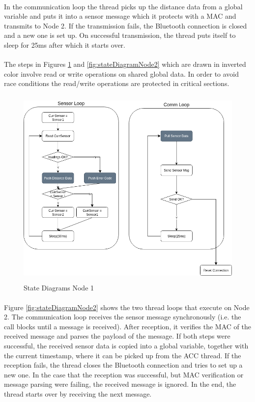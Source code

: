 \paragraph{}
In the communication loop the thread picks up the distance data from a global variable and puts it into a sensor message which it protects with a MAC and transmits to Node 2. If the transmission fails, the Bluetooth connection is closed and a new one is set up. On successful transmission, the thread puts itself to sleep for 25ms after which it starts over.

\paragraph{}
The steps in Figures \ref{fig:stateDiagramNode1} and \ref{fig:stateDiagramNode2} which are drawn in inverted color involve read or write operations on shared global data. In order to avoid race conditions the read/write operations are protected in critical sections.

\begin{figure}[h]
	\includegraphics[height=100mm]{images/StateDiagramNode1.png}
	\centering
	\caption{State Diagrams Node 1}
	\label{fig:stateDiagramNode1}
\end{figure}

\paragraph{}
Figure \ref{fig:stateDiagramNode2} shows the two thread loops that execute on Node 2. The communication loop receives the sensor message synchronously (i.e. the call blocks until a message is received). After reception, it verifies the MAC of the received message and parses the payload of the message. If both steps were successful, the received sensor data is copied into a global variable, together with the current timestamp, where it can be picked up from the ACC thread. If the reception fails,
the thread closes the Bluetooth connection and tries to set up a new one. In the case that the reception was successful, but MAC verification or message parsing were failing, the received message is ignored. In the end, the thread starts over by receiving the next message.

